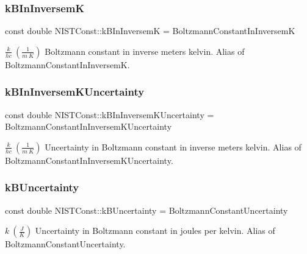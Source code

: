 \subsubsection{\texorpdfstring{k\+B\+In\+InversemK}{kBInInversemK}}
{\footnotesize\ttfamily const double N\+I\+S\+T\+Const\+::k\+B\+In\+InversemK = Boltzmann\+Constant\+In\+InversemK}

$\frac{k}{h c} \ (\frac{1}{m\ K})$ Boltzmann constant in inverse meters kelvin. Alias of Boltzmann\+Constant\+In\+InversemK. \mbox{\label{group___n_i_s_t_const-_boltzmann_constant_gafb5daa855b569ec25364ad61ecea9b2a}} 
\subsubsection{\texorpdfstring{k\+B\+In\+Inversem\+K\+Uncertainty}{kBInInversemKUncertainty}}
{\footnotesize\ttfamily const double N\+I\+S\+T\+Const\+::k\+B\+In\+Inversem\+K\+Uncertainty = Boltzmann\+Constant\+In\+Inversem\+K\+Uncertainty}

$\frac{k}{h c} \ (\frac{1}{m\ K})$ Uncertainty in Boltzmann constant in inverse meters kelvin. Alias of Boltzmann\+Constant\+In\+Inversem\+K\+Uncertainty. \mbox{\label{group___n_i_s_t_const-_boltzmann_constant_ga60fef44440e26486ae70903ff601a8e5}} 
\subsubsection{\texorpdfstring{k\+B\+Uncertainty}{kBUncertainty}}
{\footnotesize\ttfamily const double N\+I\+S\+T\+Const\+::k\+B\+Uncertainty = Boltzmann\+Constant\+Uncertainty}

$k \ (\frac{J}{K})$ Uncertainty in Boltzmann constant in joules per kelvin. Alias of Boltzmann\+Constant\+Uncertainty. 